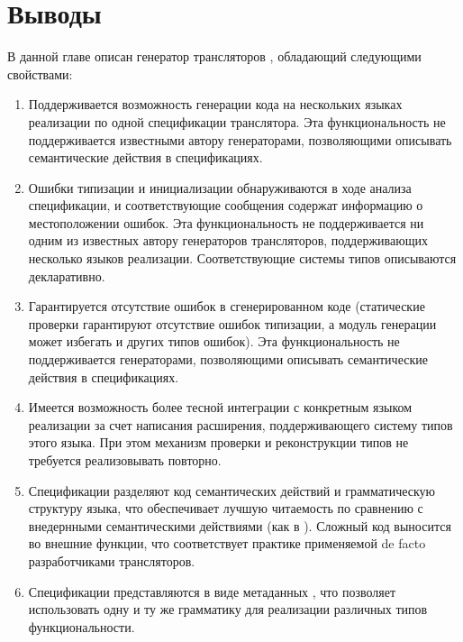 \chapter{Выводы}

В данной главе описан генератор трансляторов \ATF{}, обладающий следующими свойствами:
\begin{enumerate}
\item Поддерживается возможность генерации кода на нескольких языках реализации по одной спецификации транслятора. Эта функциональность не поддерживается известными автору генераторами, позволяющими описывать семантические действия в спецификациях.  
\item Ошибки типизации и инициализации обнаруживаются в ходе анализа спецификации, и соответствующие сообщения содержат информацию о местоположении ошибок. Эта функциональность не поддерживается ни одним из известных автору генераторов трансляторов, поддерживающих несколько языков реализации. Соответствующие системы типов описываются декларативно.
\item Гарантируется отсутствие ошибок в сгенерированном коде (статические проверки гарантируют отсутствие ошибок типизации, а модуль генерации может избегать и других типов ошибок). Эта функциональность не поддерживается  генераторами, позволяющими описывать семантические действия в спецификациях.
\item Имеется возможность более тесной интеграции с конкретным языком реализации за счет написания расширения, поддерживающего систему типов этого языка. При этом механизм проверки и реконструкции типов не требуется реализовывать повторно.
\item Спецификации разделяют код семантических действий и грамматическую структуру языка, что обеспечивает лучшую читаемость по сравнению с внедернными семантическими действиями (как в ). Сложный код выносится во внешние функции, что соответствует практике применяемой de facto разработчиками трансляторов.
\item Спецификации представляются в виде метаданных \GRM{}, что позволяет использовать одну и ту же грамматику для реализации различных типов функциональности.
\end{enumerate}
